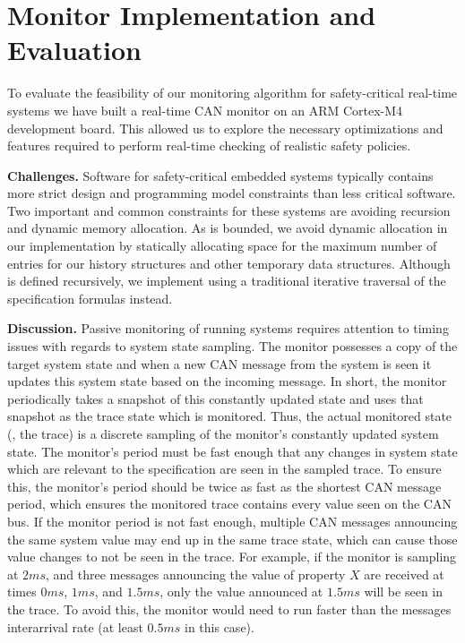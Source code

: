 
\section{Monitor Implementation and Evaluation}
\label{sec:implementation}

To evaluate the feasibility of our monitoring algorithm for safety-critical
real-time systems we have built a real-time CAN monitor on an ARM Cortex-M4
development board. This allowed us to explore the necessary optimizations and
features required to perform real-time checking of realistic safety policies.


\noindent\textbf{Challenges. }
Software for safety-critical embedded systems typically contains more strict
design and programming model constraints than less critical software. Two
important and common constraints for these systems are avoiding recursion  and
 dynamic memory allocation.
As \planguage is bounded, we avoid dynamic allocation
in our \monitor implementation by statically allocating space for the maximum
number of entries for our history structures and other temporary data structures.
Although \monitor is defined recursively,
we  implement \monitor using a traditional iterative traversal
of the specification formulas instead.

\noindent\textbf{Discussion. }
Passive monitoring of running systems requires attention to timing issues with regards to system state sampling.
%
The monitor possesses a copy of the target system state and
when a new CAN message from the system is seen it updates this
system state based on the incoming message. In short, the monitor periodically
takes a snapshot of this constantly updated state and uses that snapshot
as the trace state which is monitored.
%
Thus, the actual monitored state (\ie, the trace) is a discrete sampling of the monitor's constantly updated system state. 
The monitor's period must be fast enough that any changes in system state which are relevant to the specification are seen in the sampled trace.
To ensure this, the monitor's period should be twice as fast as the shortest CAN message period, which ensures the monitored trace contains every value seen on the CAN bus.
If the monitor period is not fast enough, multiple CAN messages announcing the same system value may end up in the same trace state, which can cause those value changes to not be seen in the trace.
For example, if the monitor is sampling at $2ms$, and three messages announcing the value of property $X$ are received at times $0ms$, $1ms$, and $1.5ms$, only the value announced at $1.5ms$ will be seen in the trace. To avoid this, the monitor would need to run faster than the messages interarrival rate (at least $0.5ms$ in this case).

